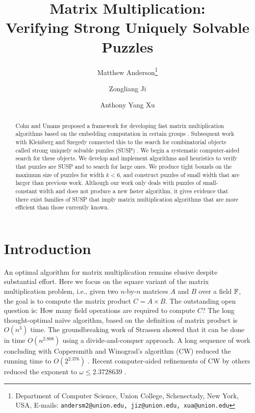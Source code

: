 \documentclass[11pt]{article}
\date{}
\title{Matrix Multiplication: \\Verifying Strong Uniquely Solvable Puzzles
{\IfFileExists{./sha.tex}{\\\small SHA: }{}}}
\author{
Matthew Anderson\thanks{Department of Computer Science, Union College, Schenectady, New York, USA, E-mails: \texttt{andersm2@union.edu, jiz@union.edu, xua@union.edu}}%
\and%
Zongliang Ji\samethanks[1]
\and%
Anthony Yang Xu\samethanks[1]
}
\begin{document}
\maketitle

\begin{abstract}
Cohn and Umans proposed a framework for developing fast matrix
multiplication algorithms based on the embedding computation in
certain groups \cite{cu03}.  Subsequent work with Kleinberg and
Szegedy connected this to the search for combinatorial objects called
strong uniquely solvable puzzles (SUSP) \cite{cksu05}.  We begin a
systematic computer-aided search for these objects.  We develop and
implement algorithms and heuristics to verify that puzzles are SUSP
and to search for large ones.  We produce tight bounds on the maximum
size of puzzles for width $k < 6$, and construct puzzles of small
width that are larger than previous work.  Although our work only
deals with puzzles of small-constant width and does not produce a new
faster algorithm, it gives evidence that there exist families of SUSP
that imply matrix multiplication algorithms that are more efficient
than those currently known.
\end{abstract}

\thispagestyle{empty}
\newpage
{}


\section{Introduction}
\label{sec:intro}


An optimal algorithm for matrix multiplication remains elusive
despite substantial effort.  Here we focus on the square variant of the
matrix multiplication problem, i.e., given two $n$-by-$n$ matrices
$A$ and $B$ over a field $\F$, the goal is to compute the matrix
product $C = A \times B$.  The outstanding open question is: How many field
operations are required to compute $C$?  The long thought-optimal na\"{i}ve algorithm,
based on the definition of matrix product is $O(n^3)$ time.
The groundbreaking work of Strassen showed that it can
be done in time $O(n^{2.808})$ \cite{str69} using a
divide-and-conquer approach.  A long sequence of work concluding with
Coppersmith and Winograd's algorithm (CW) reduced the running time
to $O(2^{2.376})$ \cite{pan78,sch81,str86,cw90}. Recent
computer-aided refinements of CW by others reduced the
exponent to $\omega \le 2.3728639$ \cite{ds13,wil12,le14}.
\end{document}
